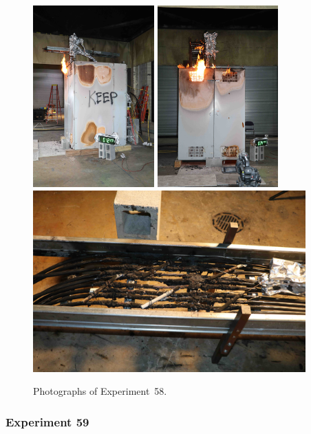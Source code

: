 \begin{figure}[p]
\centering
\includegraphics[height=2.75in,angle=-90]{../FIGURES/Test_58_12_min_29_s}
\includegraphics[height=2.75in,angle=-90]{../FIGURES/Test_58_34_min_44_s} \\
\includegraphics[height=2.75in]{../FIGURES/Test_58_scar}
\caption[Photographs of Experiment~58]{Photographs of Experiment~58.}
\label{fig:Test_58_photos}
\end{figure}


\clearpage

\subsubsection{Experiment 59}

